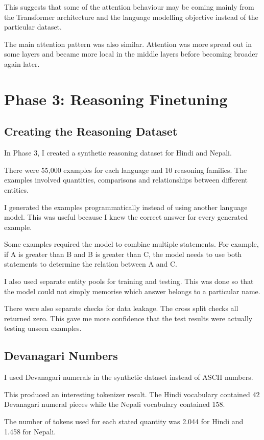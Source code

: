 \documentclass[twocolumn, 10pt]{article}
\begin{document}
This suggests that some of the attention behaviour may be coming mainly from the Transformer architecture and the language modelling objective instead of the particular dataset.

The main attention pattern was also similar. Attention was more spread out in some layers and became more local in the middle layers before becoming broader again later.

\section{Phase 3: Reasoning Finetuning}

\subsection{Creating the Reasoning Dataset}
In Phase 3, I created a synthetic reasoning dataset for Hindi and Nepali.

There were 55,000 examples for each language and 10 reasoning families. The examples involved quantities, comparisons and relationships between different entities.

I generated the examples programmatically instead of using another language model. This was useful because I knew the correct answer for every generated example.

Some examples required the model to combine multiple statements. For example, if A is greater than B and B is greater than C, the model needs to use both statements to determine the relation between A and C.

I also used separate entity pools for training and testing. This was done so that the model could not simply memorise which answer belongs to a particular name.

There were also separate checks for data leakage. The cross split checks all returned zero. This gave me more confidence that the test results were actually testing unseen examples.

\subsection{Devanagari Numbers}
I used Devanagari numerals in the synthetic dataset instead of ASCII numbers.

This produced an interesting tokenizer result. The Hindi vocabulary contained 42 Devanagari numeral pieces while the Nepali vocabulary contained 158.

The number of tokens used for each stated quantity was 2.044 for Hindi and 1.458 for Nepali.
\end{document}
